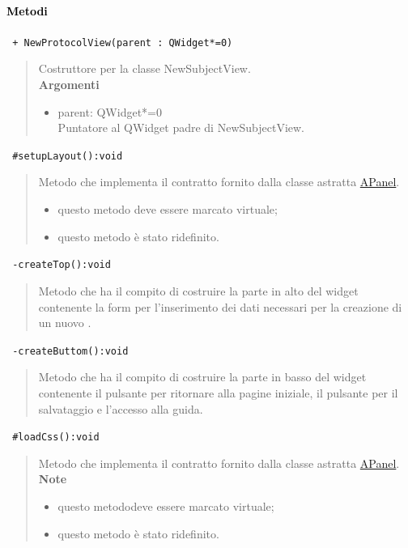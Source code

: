 \paragraph{\textcolor{black}{Metodi\\}}
\color{blue}\verb! + NewProtocolView(parent : QWidget*=0)!
\begin{quote}
\color{black}Costruttore per la classe NewSubjectView. \\
\textbf{Argomenti}
\begin{itemize}
\item parent: QWidget*=0  \\ Puntatore al QWidget padre di NewSubjectView.
\end{itemize}
\end{quote}
\color{blue}\verb! #setupLayout():void!
\begin{quote}
\color{black} Metodo che implementa il contratto fornito dalla classe astratta \hyperref[speAPanel]{APanel}.
\begin{itemize}
\item questo metodo deve essere marcato virtuale;
\item questo metodo è stato ridefinito.
\end{itemize}
\end{quote} 
\color{blue}\verb! -createTop():void!
\begin{quote}
\color{black} Metodo che ha il compito di costruire la parte in alto del widget contenente la form per l'inserimento dei dati necessari per la creazione di un nuovo \protocol{}.
\end{quote} 
\color{blue}\verb! -createButtom():void!
\begin{quote}
\color{black} Metodo che ha il compito di costruire la parte in basso del widget contenente il pulsante per ritornare alla pagine iniziale, il pulsante per il salvataggio e l'accesso alla guida.
\end{quote} 
\color{blue}\verb! #loadCss():void!
\begin{quote}
\color{black} Metodo che implementa il contratto fornito dalla classe astratta \hyperref[speAPanel]{APanel}.\\
 \textbf{Note}
 \begin{itemize}
  \item questo metododeve essere marcato virtuale;
 \item questo metodo è stato ridefinito.
 \end{itemize}
\end{quote} 
